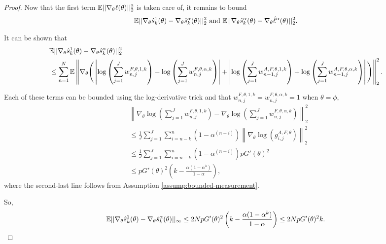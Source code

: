 \documentclass{article}
\begin{document}
\begin{proof}
Now that the first term $\mathbb{E}||\nabla_\theta\ell(\theta)||_2^2$ is taken care of, it remains to bound $$\mathbb{E}||\nabla_\theta\hat s_k^1(\theta) - \nabla_\theta\hat s_k^\alpha(\theta)||_2^2 \text{ and } \mathbb{E}||\nabla_\theta\hat s_k^\alpha(\theta) -  \nabla_\theta\hat\ell^\alpha(\theta)||_2^2.$$


It can be shown that
\begin{align*}
    &\mathbb{E}||\nabla_\theta\hat s_k^1(\theta) - \nabla_\theta\hat s_k^\alpha(\theta)||_2^2\\
    &\leq \sum_{n=1}^N \mathbb{E}\left\lVert\nabla_\theta \Bigg(\left|\log\left(\sum_{j=1}^Jw_{n,j}^{F,\theta,1,k}\right)- \log\left(\sum_{j=1}^Jw_{n,j}^{F,\theta,\alpha,k}\right)\right|
    +\left|\log\left(\sum_{j=1}^Jw_{n-1,j}^{A, F,\theta,1,k}\right) + \log\left(\sum_{j=1}^Jw_{n-1,j}^{A, F,\theta,\alpha,k}\right)\right|\Bigg)\right\rVert_2^2.
\end{align*}

Each of these terms can be bounded using the log-derivative trick and that $w_{n,j}^{F,\theta,1,k} = w_{n,j}^{F,\theta,\alpha,k} = 1$ when $\theta=\phi$,
\begin{align*}
    &\left\lVert\nabla_\theta\log\left(\sum_{j=1}^J w_{n,j}^{F,\theta,1,k}\right)-\nabla_\theta\log\left(\sum_{j=1}^J w_{n,j}^{F,\theta,\alpha,k}\right)\right\rVert_{2}^2\\
    &\leq \frac{1}{J}\sum_{j=1}^J \sum_{i=n-k}^{n}(1-\alpha^{(n-i)})\left\lVert\nabla_\theta\log\left(g_{i,j}^{A,F,\theta} \right)\right\rVert_2^2\\
    &\leq \frac{1}{J}\sum_{j=1}^J \sum_{i=n-k}^{n}(1-\alpha^{(n-i)})pG'(\theta)^2\\
    &\leq pG'(\theta)^2\left(k-\frac{\alpha(1-\alpha^k)}{1-\alpha}\right),
\end{align*}
where the second-last line follows from Assumption \ref{assump:bounded-measurement}.

So, 
\begin{align*}
    \mathbb{E}||\nabla_\theta\hat s_k^1(\theta) - \nabla_\theta\hat s_k^\alpha(\theta)||_\infty
    \leq 2NpG'(\theta)^2\left(k-\frac{\alpha(1-\alpha^k)}{1-\alpha}\right) 
    \leq 2NpG'(\theta)^2k.
\end{align*}



\end{proof}
\end{document}
